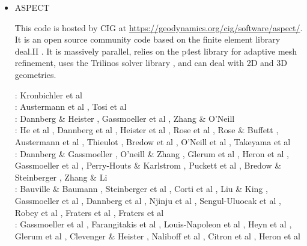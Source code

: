 \begin{itemize}
\item {\codefont ASPECT} 

This code is hosted by CIG at \url{https://geodynamics.org/cig/software/aspect/}. 
It is an open source community code based on the finite element library deal.II \cite{bahk07,arbc19,arbd20}. 
It is massively parallel, relies on the p4est library for adaptive mesh refinement,
uses the Trilinos solver library \cite{hewi12}, and can deal with 2D and 3D geometries. 

\begin{scriptsize}
\noindent
\twothousandtwelve:
Kronbichler et al \cite{krhb12}\\
\twothousandfifteen:
Austermann et al \cite{aupm15}, Tosi et al \cite{tosn15}\\
\twothousandsixteen:
Dannberg \& Heister \cite{dahe16}, Gassmoeller et al \cite{gadb16}, Zhang \& O'Neill \cite{zhon16}\\
\twothousandseventeen:
He et al \cite{hepb17}, Dannberg et al \cite{daef17}, Heister et al \cite{hedg17},
Rose et al \cite{robh17}, Rose \& Buffett \cite{robu17}, Austermann et al \cite{aumh17},
Thieulot \cite{thie17}, Bredow et al \cite{brsg17}, O'Neill et al \cite{onmz17},
Takeyama et al \cite{tasm17}\\
\twothousandeighteen:
Dannberg \& Gassmoeller \cite{daga18}, O'neill \& Zhang \cite{onzh18}, 
Glerum et al \cite{gltf18}, Heron et al \cite{heps18}, Gassmoeller et al \cite{galh18}, 
Perry-Houts \& Karlstrom \cite{peka18}, Puckett et al \cite{puth18},
Bredow \& Steinberger \cite{brst18b}, Zhang \& Li \cite{zhli18}\\
\twothousandnineteen:
Bauville \& Baumann \cite{baba19}, Steinberger et al \cite{stbl19}, Corti et al \cite{cocf19},
Liu \& King \cite{liki19}, Gassmoeller et al \cite{galb19}, Dannberg et al \cite{dagg19},
Njinju et al \cite{njas19}, Sengul-Uluocak et al \cite{sepg19}, Robey et al \cite{ropu19},
Fraters et al \cite{frtv19}, Fraters et al \cite{frbt19}\\
\twothousandtwenty:
Gassmoeller et al \cite{gadb20}, Farangitakis et al \cite{fahm20}, 
Louis-Napoleon et al \cite{logb20}, Heyn et al \cite{hect20}, Glerum et al \cite{glbs20},
Clevenger \& Heister \cite{clhe20}, Naliboff et al \cite{nagb20}, Citron et al \cite{cilw20},
Heron et al \cite{hemn20}
\end{scriptsize}


\end{itemize}

